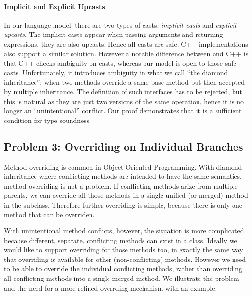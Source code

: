 
\paragraph{Implicit and Explicit Upcasts}
In our language model, there are two types of casts: \emph{implicit casts} and \emph{explicit upcasts}. The implicit casts appear
when passing arguments and returning expressions, they are also
upcasts. Hence all casts are safe. C++ implementations also support a
similar solution. However a notable difference between \MIM{} and C++
is that C++ checks ambiguity on casts, whereas our model is open to those safe casts. Unfortunately,
it introduces ambiguity in what we call ``the diamond inheritance'': when two methods override a same base method
but then accepted by multiple inheritance. The definition of such interfaces has to be rejected,
but this is natural as they are just two versions of the same operation, hence it is no longer an ``unintentional'' conflict.
Our proof demonstrates that it is a sufficient condition for type
soundness.




\subsection{Problem 3: Overriding on Individual Branches}\label{subsec:partialoverrides}

Method overriding is common in Object-Oriented Programming. 
With diamond inheritance where conflicting methods are intended to have 
the same semantics, method overriding is not a problem. If conflicting
methods arize from multiple parents, we can override all those methods 
in a single unified (or merged) method in the subclass. Therefore
further overriding is simple, because there is only one method that
can be overriden. 

With unintentional method conflicts, however, the situation is more
complicated because different, separate, conflicting methods can exist
in a class. Ideally we would like to support overriding for those
methods too, in exactly the same way that overriding is available for 
other (non-conflicting) methods. However we need to be able to
override the individual conflicting methods, rather than overriding all
conflicting methods into a single merged method.  We illustrate the
problem and the need for a more refined overrding mechanism with 
an example.

